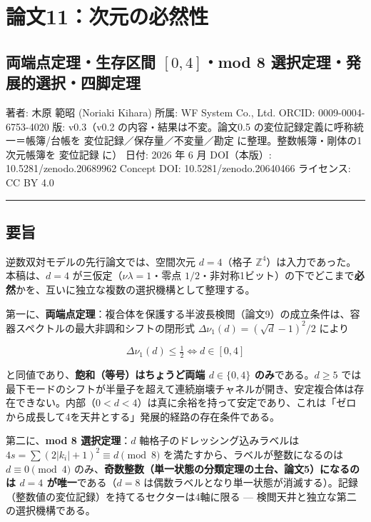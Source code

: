 \documentclass[
]{ltjsarticle}
\author{}
\date{}
\begin{document}
\section{論文11：次元の必然性}\label{ux8ad6ux658711ux6b21ux5143ux306eux5fc5ux7136ux6027}

\subsection{\texorpdfstring{両端点定理・生存区間 \([0,4]\)・mod 8
選択定理・発展的選択・四脚定理}{両端点定理・生存区間 {[}0,4{]}・mod 8 選択定理・発展的選択・四脚定理}}\label{ux4e21ux7aefux70b9ux5b9aux7406ux751fux5b58ux533aux9593-04mod-8-ux9078ux629eux5b9aux7406ux767aux5c55ux7684ux9078ux629eux56dbux811aux5b9aux7406}

著者: 木原 範昭 (Noriaki Kihara) 所属: WF System Co., Ltd. ORCID:
0009-0004-6753-4020 版: v0.3（v0.2 の内容・結果は不変。論文0.5
の変位記録定義に呼称統一＝帳簿/台帳を 変位記録／保存量／不変量／勘定
に整理。整数帳簿・剛体の1次元帳簿を 変位記録 に） 日付: 2026 年 6 月
DOI（本版）: 10.5281/zenodo.20689962 Concept DOI:
10.5281/zenodo.20640466 ライセンス: CC BY 4.0

\begin{center}\rule{0.5\linewidth}{0.5pt}\end{center}

\subsection{要旨}\label{ux8981ux65e8}

逆数双対モデルの先行論文では、空間次元 \(d=4\)（格子
\(\mathbb{Z}^4\)）は入力であった。本稿は、\(d=4\)
が三仮定（\(\nu\lambda=1\)・零点
\(1/2\)・非対称1ビット）の下でどこまで\textbf{必然}かを、互いに独立な複数の選択機構として整理する。

第一に、\textbf{両端点定理}：複合体を保護する半波長検閲（論文9）の成立条件は、容器スペクトルの最大非調和シフトの閉形式
\(\Delta\nu_1(d)=(\sqrt d-1)^2/2\) により

\[
\Delta\nu_1(d)\le\tfrac12\iff d\in[0,4]
\]

と同値であり、\textbf{飽和（等号）はちょうど両端 \(d\in\{0,4\}\)
のみ}である。\(d\ge5\)
では最下モードのシフトが半量子を超えて連続崩壊チャネルが開き、安定複合体は存在できない。内部（\(0<d<4\)）は真に余裕を持って安定であり、これは「ゼロから成長して4を天井とする」発展的経路の存在条件である。

第二に、\textbf{mod 8 選択定理}：\(d\) 軸格子のドレッシング込みラベルは
\(4s=\sum(2|k_i|+1)^2\equiv d\pmod 8\)
を満たすから、ラベルが整数になるのは \(d\equiv0\pmod4\)
のみ、\textbf{奇数整数（単一状態の分類定理の土台、論文5）になるのは
\(d=4\) が唯一}である（\(d=8\)
は偶数ラベルとなり単一状態が消滅する）。記録（整数値の変位記録）を持てるセクターは4軸に限る
--- 検閲天井と独立な第二の選択機構である。
\end{document}
